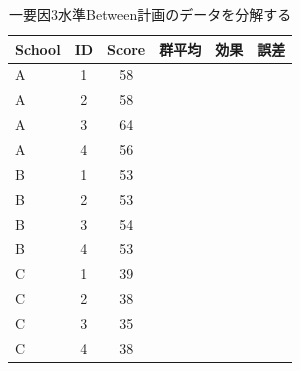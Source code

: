\begin{table}[ht]
	\centering
	\caption{一要因3水準Between計画のデータを分解する}
	\begin{tabular}{lccccc}
		\hline
		School & ID & Score & 群平均 & 効果 & 誤差 \\
		\hline
		A      & 1  & 58    &     &    &    \\
		A      & 2  & 58    &     &    &    \\
		A      & 3  & 64    &     &    &    \\
		A      & 4  & 56    &     &    &    \\
		B      & 1  & 53    &     &    &    \\
		B      & 2  & 53    &     &    &    \\
		B      & 3  & 54    &     &    &    \\
		B      & 4  & 53    &     &    &    \\
		C      & 1  & 39    &     &    &    \\
		C      & 2  & 38    &     &    &    \\
		C      & 3  & 35    &     &    &    \\
		C      & 4  & 38    &     &    &    \\
		\hline
	\end{tabular}
	\label{tbl:m12_example}
\end{table}
